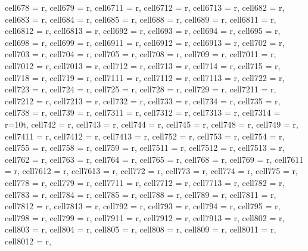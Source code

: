 \begin{landscape}
\begin{longtblr}[
  caption = {Changes in average values and effects differences significance from post hoc analysis.},
  label = {tab:appendix_LCBM_all_results_post_hocs}
]
{  cell{67}{8} = {r},
  cell{67}{9} = {r},
  cell{67}{11} = {r},
  cell{67}{12} = {r},
  cell{67}{13} = {r},
  cell{68}{2} = {r},
  cell{68}{3} = {r},
  cell{68}{4} = {r},
  cell{68}{5} = {r},
  cell{68}{8} = {r},
  cell{68}{9} = {r},
  cell{68}{11} = {r},
  cell{68}{12} = {r},
  cell{68}{13} = {r},
  cell{69}{2} = {r},
  cell{69}{3} = {r},
  cell{69}{4} = {r},
  cell{69}{5} = {r},
  cell{69}{8} = {r},
  cell{69}{9} = {r},
  cell{69}{11} = {r},
  cell{69}{12} = {r},
  cell{69}{13} = {r},
  cell{70}{2} = {r},
  cell{70}{3} = {r},
  cell{70}{4} = {r},
  cell{70}{5} = {r},
  cell{70}{8} = {r},
  cell{70}{9} = {r},
  cell{70}{11} = {r},
  cell{70}{12} = {r},
  cell{70}{13} = {r},
  cell{71}{2} = {r},
  cell{71}{3} = {r},
  cell{71}{4} = {r},
  cell{71}{5} = {r},
  cell{71}{8} = {r},
  cell{71}{9} = {r},
  cell{71}{11} = {r},
  cell{71}{12} = {r},
  cell{71}{13} = {r},
  cell{72}{2} = {r},
  cell{72}{3} = {r},
  cell{72}{4} = {r},
  cell{72}{5} = {r},
  cell{72}{8} = {r},
  cell{72}{9} = {r},
  cell{72}{11} = {r},
  cell{72}{12} = {r},
  cell{72}{13} = {r},
  cell{73}{2} = {r},
  cell{73}{3} = {r},
  cell{73}{4} = {r},
  cell{73}{5} = {r},
  cell{73}{8} = {r},
  cell{73}{9} = {r},
  cell{73}{11} = {r},
  cell{73}{12} = {r},
  cell{73}{13} = {r},
  cell{73}{14} = {r=10}{t},
  cell{74}{2} = {r},
  cell{74}{3} = {r},
  cell{74}{4} = {r},
  cell{74}{5} = {r},
  cell{74}{8} = {r},
  cell{74}{9} = {r},
  cell{74}{11} = {r},
  cell{74}{12} = {r},
  cell{74}{13} = {r},
  cell{75}{2} = {r},
  cell{75}{3} = {r},
  cell{75}{4} = {r},
  cell{75}{5} = {r},
  cell{75}{8} = {r},
  cell{75}{9} = {r},
  cell{75}{11} = {r},
  cell{75}{12} = {r},
  cell{75}{13} = {r},
  cell{76}{2} = {r},
  cell{76}{3} = {r},
  cell{76}{4} = {r},
  cell{76}{5} = {r},
  cell{76}{8} = {r},
  cell{76}{9} = {r},
  cell{76}{11} = {r},
  cell{76}{12} = {r},
  cell{76}{13} = {r},
  cell{77}{2} = {r},
  cell{77}{3} = {r},
  cell{77}{4} = {r},
  cell{77}{5} = {r},
  cell{77}{8} = {r},
  cell{77}{9} = {r},
  cell{77}{11} = {r},
  cell{77}{12} = {r},
  cell{77}{13} = {r},
  cell{78}{2} = {r},
  cell{78}{3} = {r},
  cell{78}{4} = {r},
  cell{78}{5} = {r},
  cell{78}{8} = {r},
  cell{78}{9} = {r},
  cell{78}{11} = {r},
  cell{78}{12} = {r},
  cell{78}{13} = {r},
  cell{79}{2} = {r},
  cell{79}{3} = {r},
  cell{79}{4} = {r},
  cell{79}{5} = {r},
  cell{79}{8} = {r},
  cell{79}{9} = {r},
  cell{79}{11} = {r},
  cell{79}{12} = {r},
  cell{79}{13} = {r},
  cell{80}{2} = {r},
  cell{80}{3} = {r},
  cell{80}{4} = {r},
  cell{80}{5} = {r},
  cell{80}{8} = {r},
  cell{80}{9} = {r},
  cell{80}{11} = {r},
  cell{80}{12} = {r},
}
\end{longtblr}
\end{landscape}
